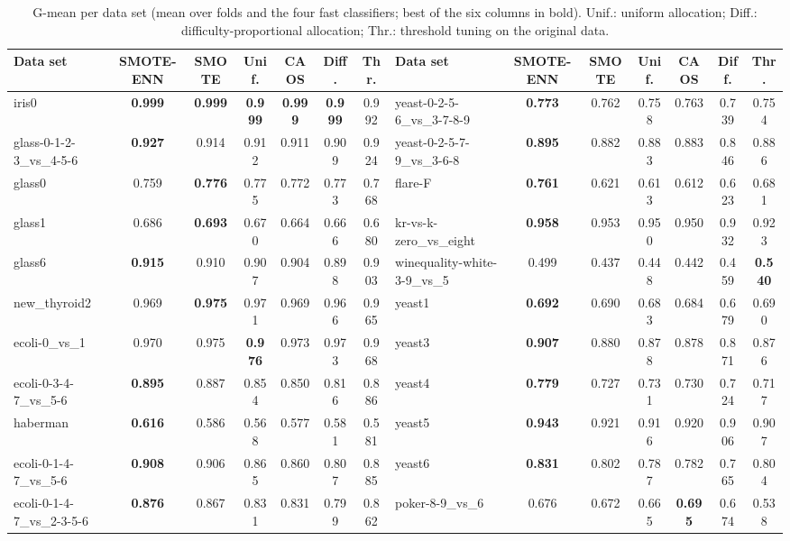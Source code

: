 \begin{table}[t]
\centering
\caption{G-mean per data set (mean over folds and the four fast classifiers; best of the six columns in bold). Unif.: uniform allocation; Diff.: difficulty-proportional allocation; Thr.: threshold tuning on the original data.}
\label{tab:perdataset}
\scriptsize
\setlength{\tabcolsep}{2.5pt}
\begin{tabular}{@{}lcccccc@{\hspace{12pt}}lcccccc@{}}
\toprule
Data set & SMOTE-ENN & SMOTE & Unif. & CAOS & Diff. & Thr. & Data set & SMOTE-ENN & SMOTE & Unif. & CAOS & Diff. & Thr. \\
\midrule
iris0 & \textbf{0.999} & \textbf{0.999} & \textbf{0.999} & \textbf{0.999} & \textbf{0.999} & 0.992 & yeast-0-2-5-6\_vs\_3-7-8-9 & \textbf{0.773} & 0.762 & 0.758 & 0.763 & 0.739 & 0.754 \\
glass-0-1-2-3\_vs\_4-5-6 & \textbf{0.927} & 0.914 & 0.912 & 0.911 & 0.909 & 0.924 & yeast-0-2-5-7-9\_vs\_3-6-8 & \textbf{0.895} & 0.882 & 0.883 & 0.883 & 0.846 & 0.886 \\
glass0 & 0.759 & \textbf{0.776} & 0.775 & 0.772 & 0.773 & 0.768 & flare-F & \textbf{0.761} & 0.621 & 0.613 & 0.612 & 0.623 & 0.681 \\
glass1 & 0.686 & \textbf{0.693} & 0.670 & 0.664 & 0.666 & 0.680 & kr-vs-k-zero\_vs\_eight & \textbf{0.958} & 0.953 & 0.950 & 0.950 & 0.932 & 0.923 \\
glass6 & \textbf{0.915} & 0.910 & 0.907 & 0.904 & 0.898 & 0.903 & winequality-white-3-9\_vs\_5 & 0.499 & 0.437 & 0.448 & 0.442 & 0.459 & \textbf{0.540} \\
new\_thyroid2 & 0.969 & \textbf{0.975} & 0.971 & 0.969 & 0.966 & 0.965 & yeast1 & \textbf{0.692} & 0.690 & 0.683 & 0.684 & 0.679 & 0.690 \\
ecoli-0\_vs\_1 & 0.970 & 0.975 & \textbf{0.976} & 0.973 & 0.973 & 0.968 & yeast3 & \textbf{0.907} & 0.880 & 0.878 & 0.878 & 0.871 & 0.876 \\
ecoli-0-3-4-7\_vs\_5-6 & \textbf{0.895} & 0.887 & 0.854 & 0.850 & 0.816 & 0.886 & yeast4 & \textbf{0.779} & 0.727 & 0.731 & 0.730 & 0.724 & 0.717 \\
haberman & \textbf{0.616} & 0.586 & 0.568 & 0.577 & 0.581 & 0.581 & yeast5 & \textbf{0.943} & 0.921 & 0.916 & 0.920 & 0.906 & 0.907 \\
ecoli-0-1-4-7\_vs\_5-6 & \textbf{0.908} & 0.906 & 0.865 & 0.860 & 0.807 & 0.885 & yeast6 & \textbf{0.831} & 0.802 & 0.787 & 0.782 & 0.765 & 0.804 \\
ecoli-0-1-4-7\_vs\_2-3-5-6 & \textbf{0.876} & 0.867 & 0.831 & 0.831 & 0.799 & 0.862 & poker-8-9\_vs\_6 & 0.676 & 0.672 & 0.665 & \textbf{0.695} & 0.674 & 0.538 \\

\end{tabular}
\end{table}
